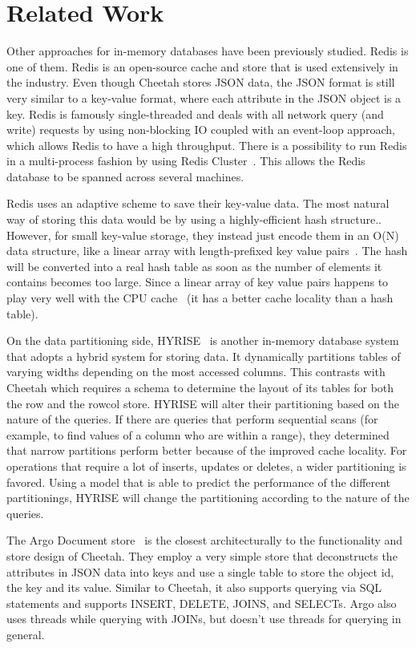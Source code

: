 \documentclass[11pt,journal,compsoc]{IEEEtran}
\begin{document}
\section{Related Work}
Other approaches for in-memory databases have been previously studied. Redis is one of them. Redis is an open-source cache and store that is used extensively in the industry. Even though Cheetah stores JSON data, the JSON format is still very similar to a key-value format, where each attribute in the JSON object is a key. Redis is famously single-threaded and deals with all network query (and write) requests by using non-blocking IO coupled with an event-loop approach, which allows Redis to have a high throughput. There is a possibility to run Redis in a multi-process fashion by using Redis Cluster~\cite{redis-cluster}. This allows the Redis database to be spanned across several machines.

Redis uses an adaptive scheme to save their key-value data. The most natural way of storing this data would be by using a highly-efficient hash structure.. However, for small key-value storage, they instead just encode them in an O(N) data structure, like a linear array with length-prefixed key value pairs~\cite{redis}. The hash will be converted into a real hash table as soon as the number of elements it contains becomes too large. Since a linear array of key value pairs happens to play very well with the CPU cache~\cite{redis} (it has a better cache locality than a hash table).

On the data partitioning side, HYRISE~\cite{hyrise} is another in-memory database system that adopts a hybrid system for storing data. It dynamically partitions tables of varying widths depending on the most accessed columns. This contrasts with Cheetah which requires a schema to determine the layout of its tables for both the row and the rowcol store. HYRISE will alter their partitioning based on the nature of the queries. If there are queries that perform sequential scans (for example, to find values of a column who are within a range), they determined that narrow partitions perform better because of the improved cache locality. For operations that require a lot of inserts, updates or deletes, a wider partitioning is favored. Using a model that is able to predict the performance of the different partitionings, HYRISE will change the partitioning according to the nature of the queries. 


The Argo Document store~\cite{argo} is the closest architecturally to the functionality and store design of Cheetah. They employ a very simple store that deconstructs the attributes in JSON data into keys and use a single table to store the object id, the key and its value. Similar to Cheetah, it also supports querying via SQL statements and supports INSERT, DELETE, JOINS, and SELECTs. Argo also uses threads while querying with JOINs, but doesn’t use threads for querying in general.
\end{document}

